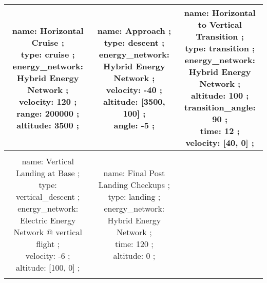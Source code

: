 \begin{table}[h]
\begin{adjustbox}{width=1\textwidth}
\begin{tabular}{|c|c|c|}
\makecell{name: Horizontal Cruise ; \\ type: cruise ; \\ energy\_network: Hybrid Energy Network ; \\ velocity: 120 ; \\ range: 200000 ; \\ altitude: 3500 ; \\ } & \makecell{name: Approach ; \\ type: descent ; \\ energy\_network: Hybrid Energy Network ; \\ velocity: -40 ; \\ altitude: [3500, 100] ; \\ angle: -5 ; \\ } & \makecell{name: Horizontal to Vertical Transition ; \\ type: transition ; \\ energy\_network: Hybrid Energy Network ; \\ altitude: 100 ; \\ transition\_angle: 90 ; \\ time: 12 ; \\ velocity: [40, 0] ; \\ }\\ \hline \\ 
\makecell{name: Vertical Landing at Base ; \\ type: vertical\_descent ; \\ energy\_network: Electric Energy Network @ vertical flight ; \\ velocity: -6 ; \\ altitude: [100, 0] ; \\ } & \makecell{name: Final Post Landing Checkups ; \\ type: landing ; \\ energy\_network: Hybrid Energy Network ; \\ time: 120 ; \\ altitude: 0 ; \\ } & \\ \hline \\ 
\end{tabular} 
 \end{adjustbox} 
 \end{table} 
 \FloatBarrier 
